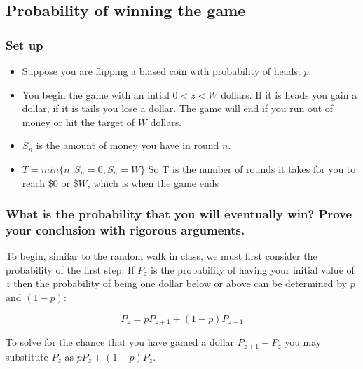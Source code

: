 \documentclass[]{article}
\begin{document}
\hypertarget{probability-of-winning-the-game}{%
\subsection{Probability of winning the
game}\label{probability-of-winning-the-game}}

\hypertarget{set-up}{%
\subsubsection{Set up}\label{set-up}}

\begin{itemize}
\item
  Suppose you are flipping a biased coin with probability of heads:
  \(p\).
\item
  You begin the game with an intial \(0 < z < W\) dollars. If it is
  heads you gain a dollar, if it is tails you lose a dollar. The game
  will end if you run out of money or hit the target of \(W\) dollars.
\item
  \(S_n\) is the amount of money you have in round \(n\).
\item
  \(T = min\{n : S_n = 0, S_n = W\}\) So T is the number of rounds it
  takes for you to reach \$0 or \$\(W\), which is when the game ends
\end{itemize}

\hypertarget{what-is-the-probability-that-you-will-eventually-win-prove-your-conclusion-with-rigorous-arguments.}{%
\subsubsection{\texorpdfstring{\textbf{What is the probability that you
will eventually win? Prove your conclusion with rigorous
arguments.}}{What is the probability that you will eventually win? Prove your conclusion with rigorous arguments.}}\label{what-is-the-probability-that-you-will-eventually-win-prove-your-conclusion-with-rigorous-arguments.}}

To begin, similar to the random walk in class, we must first consider
the probability of the first step. If \(P_z\) is the probability of
having your initial value of \(z\) then the probability of being one
dollar below or above can be determined by \(p\) and \((1-p)\):

\[P_z = pP_{z+1} + (1-p)P_{z-1}\]

To solve for the chance that you have gained a dollar \(P_{z+1} - P_z\)
you may substitute \(P_z\) as \(pP_z + (1-p)P_z\).
\end{document}
